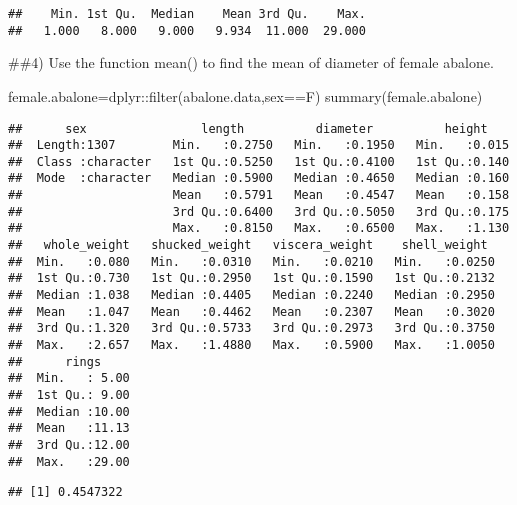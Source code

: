 \documentclass[
]{article}
\newenvironment{Shaded}{\begin{snugshade}}{\end{snugshade}}
\newcommand{\FunctionTok}[1]{\textcolor[rgb]{0.00,0.00,0.00}{#1}}
\newcommand{\NormalTok}[1]{#1}
\newcommand{\OtherTok}[1]{\textcolor[rgb]{0.56,0.35,0.01}{#1}}
\newcommand{\SpecialCharTok}[1]{\textcolor[rgb]{0.00,0.00,0.00}{#1}}
\newcommand{\StringTok}[1]{\textcolor[rgb]{0.31,0.60,0.02}{#1}}
\begin{document}
\begin{verbatim}
##    Min. 1st Qu.  Median    Mean 3rd Qu.    Max. 
##   1.000   8.000   9.000   9.934  11.000  29.000
\end{verbatim}

\#\#4) Use the function mean() to find the mean of diameter of female
abalone.

\begin{Shaded}
\begin{Highlighting}[]
\NormalTok{female.abalone}\OtherTok{=}\NormalTok{dplyr}\SpecialCharTok{::}\FunctionTok{filter}\NormalTok{(abalone.data,sex}\SpecialCharTok{==}\StringTok{\textquotesingle{}F\textquotesingle{}}\NormalTok{)}
\FunctionTok{summary}\NormalTok{(female.abalone)}
\end{Highlighting}
\end{Shaded}

\begin{verbatim}
##      sex                length          diameter          height     
##  Length:1307        Min.   :0.2750   Min.   :0.1950   Min.   :0.015  
##  Class :character   1st Qu.:0.5250   1st Qu.:0.4100   1st Qu.:0.140  
##  Mode  :character   Median :0.5900   Median :0.4650   Median :0.160  
##                     Mean   :0.5791   Mean   :0.4547   Mean   :0.158  
##                     3rd Qu.:0.6400   3rd Qu.:0.5050   3rd Qu.:0.175  
##                     Max.   :0.8150   Max.   :0.6500   Max.   :1.130  
##   whole_weight   shucked_weight   viscera_weight    shell_weight   
##  Min.   :0.080   Min.   :0.0310   Min.   :0.0210   Min.   :0.0250  
##  1st Qu.:0.730   1st Qu.:0.2950   1st Qu.:0.1590   1st Qu.:0.2132  
##  Median :1.038   Median :0.4405   Median :0.2240   Median :0.2950  
##  Mean   :1.047   Mean   :0.4462   Mean   :0.2307   Mean   :0.3020  
##  3rd Qu.:1.320   3rd Qu.:0.5733   3rd Qu.:0.2973   3rd Qu.:0.3750  
##  Max.   :2.657   Max.   :1.4880   Max.   :0.5900   Max.   :1.0050  
##      rings      
##  Min.   : 5.00  
##  1st Qu.: 9.00  
##  Median :10.00  
##  Mean   :11.13  
##  3rd Qu.:12.00  
##  Max.   :29.00
\end{verbatim}

\begin{Shaded}
\end{Shaded}

\begin{verbatim}
## [1] 0.4547322
\end{verbatim}
\end{document}
